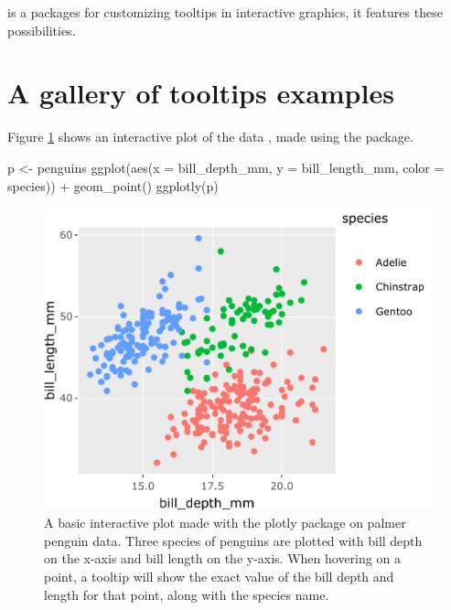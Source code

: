  is a packages for customizing tooltips in interactive
graphics, it features these possibilities.

\hypertarget{a-gallery-of-tooltips-examples}{%
\section{A gallery of tooltips
examples}\label{a-gallery-of-tooltips-examples}}

Figure \ref{fig:penguins-plotly} shows an interactive plot of the
 data \citep{palmerpenguins}, made using the
 package.

\begin{Schunk}
\begin{Sinput}
p <- penguins %
  ggplot(aes(x = bill_depth_mm, y = bill_length_mm, 
             color = species)) + 
  geom_point()
ggplotly(p)
\end{Sinput}
\begin{figure}
\includegraphics{sample-article_files/figure-latex/penguins-plotly-1} \caption[A basic interactive plot made with the plotly package on palmer penguin data]{A basic interactive plot made with the plotly package on palmer penguin data. Three species of penguins are plotted with bill depth on the x-axis and bill length on the y-axis. When hovering on a point, a tooltip will show the exact value of the bill depth and length for that point, along with the species name.}\label{fig:penguins-plotly}
\end{figure}
\end{Schunk}

